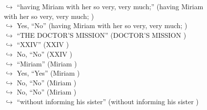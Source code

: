 \documentclass[11pt,a4paper, onecolumn]{article}
\begin{document}
\begin{figure}[t] \small \begin{tcolorbox}[boxsep=0pt,left=5pt,right=0pt,top=2pt,colback = yellow!5] \begin{dialogue}
 \small 
\colorbox{pink!25}{$\hookrightarrow$}
{ ``having Miriam with her so very, very much;'' (having Miriam with her so very, very much; ) }
\\
\colorbox{pink!25}{$\hookrightarrow$}
\colorbox{red!25}{Yes,}
{ ``No'' (having Miriam with her so very, very much; ) }
\\
\colorbox{pink!25}{$\hookrightarrow$}
{ ``THE DOCTOR'S MISSION'' (DOCTOR'S MISSION ) }
\\
\colorbox{pink!25}{$\hookrightarrow$}
{ ``XXIV'' (XXIV ) }
\\
\colorbox{pink!25}{$\hookrightarrow$}
\colorbox{red!25}{No,}
{ ``No'' (XXIV ) }
\\
\colorbox{pink!25}{$\hookrightarrow$}
{ ``Miriam'' (Miriam ) }
\\
\colorbox{pink!25}{$\hookrightarrow$}
\colorbox{red!25}{Yes,}
{ ``Yes'' (Miriam ) }
\\
\colorbox{pink!25}{$\hookrightarrow$}
\colorbox{red!25}{No,}
{ ``No'' (Miriam ) }
\\
\colorbox{pink!25}{$\hookrightarrow$}
\colorbox{red!25}{No,}
{ ``No'' (Miriam ) }
\\
\colorbox{pink!25}{$\hookrightarrow$}
{ ``without informing his sister'' (without informing his sister ) }
\\
 \end{dialogue}\end{tcolorbox}\end{figure}
\end{document}
